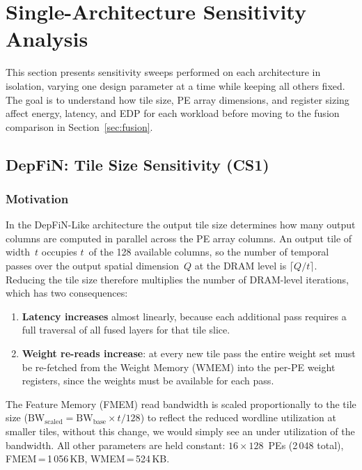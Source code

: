 \section{Single-Architecture Sensitivity Analysis}
\label{sec:single-arch}

This section presents sensitivity sweeps performed on each architecture
in isolation, varying one design parameter at a time while keeping all
others fixed.
The goal is to understand how tile size, PE array dimensions, and
register sizing affect energy, latency, and EDP for each workload
before moving to the fusion comparison in Section~\ref{sec:fusion}.


\subsection{DepFiN: Tile Size Sensitivity (CS1)}
\label{sec:cs1-tile}

\subsubsection{Motivation}

In the DepFiN-Like architecture the output tile size determines how
many output columns are computed in parallel across the PE array
columns.
An output tile of width~$t$ occupies $t$~of the 128 available columns, so
the number of temporal passes over the output spatial
dimension~$Q$ at the DRAM level is $\lceil Q / t \rceil$.
Reducing the tile size therefore multiplies the number of DRAM-level
iterations, which has two consequences:
%
\begin{enumerate}
  \item \textbf{Latency increases} almost linearly, because
        each additional pass requires a full traversal of all
        fused layers for that tile slice.
  \item \textbf{Weight re-reads increase}: at every new tile pass the
        entire weight set must be re-fetched from the Weight Memory (WMEM)
        into the per-PE weight registers, since the weights must be available for each pass.
\end{enumerate}
%
The Feature Memory (FMEM) read bandwidth is scaled proportionally to the tile size
($\text{BW}_{\text{scaled}} = \text{BW}_{\text{base}} \times t / 128$) to reflect the reduced wordline utilization at smaller tiles,
without this change, we would simply see an under utilization of the bandwidth.
All other parameters are held constant: $16 \times 128$~PEs
(2\,048 total), FMEM\,=\,1\,056\,KB, WMEM\,=\,524\,KB.

